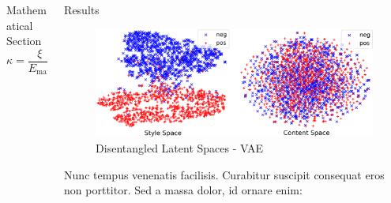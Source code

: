\documentclass[final]{beamer}
\newlength{\onecolwid}
\newlength{\twocolwid}
\begin{document}
\begin{frame}[t]
\begin{columns}[t]
\begin{column}{\twocolwid}
\begin{columns}[t,totalwidth=\twocolwid]
\begin{column}{\onecolwid}
\begin{block}{Mathematical Section}
                        \begin{equation}
                            \kappa =\frac{\xi}{E_{\mathrm{max}}} %
                        \end{equation}

                    \end{block}


                \end{column} %

                \begin{column}{\onecolwid} %


                    \begin{block}{Results}

                        \begin{figure}
                            \includegraphics[width=\linewidth]{vae-latent-spaces}
                            \caption{Disentangled Latent Spaces - VAE}
                        \end{figure}

                        Nunc tempus venenatis facilisis. Curabitur suscipit consequat eros non porttitor. Sed a massa dolor, id ornare enim:


\end{block}
\end{column}
\end{columns}
\end{column}
\end{columns}
\end{frame}
\end{document}
